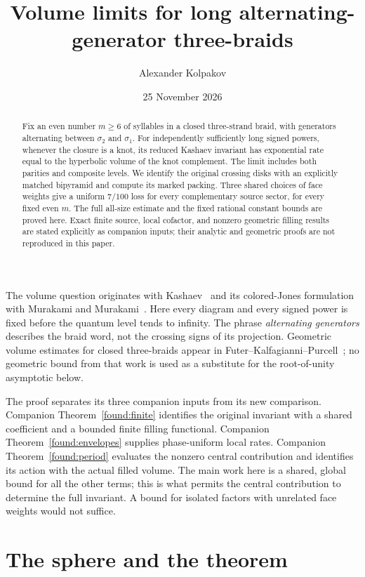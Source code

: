 \documentclass[11pt]{article}
\title{Volume limits for long alternating-generator three-braids}
\author{Alexander Kolpakov}\date{25 November 2026}
\numberwithin{equation}{section}
\begin{document}
\maketitle
\begin{abstract}
Fix an even number \(m\ge6\) of syllables in a closed three-strand braid,
with generators alternating between \(\sigma_2\) and \(\sigma_1\).
For independently sufficiently long signed powers, whenever the closure
is a knot, its reduced Kashaev invariant has exponential rate equal to
the hyperbolic volume of the knot complement. The limit includes both
parities and composite levels. We identify the original crossing disks
with an explicitly matched bipyramid and compute its marked packing.
Three shared choices of face weights give a uniform \(7/100\) loss for
every complementary source sector, for every fixed even \(m\).
The full all-size estimate and the fixed rational constant bounds are
proved here. Exact finite source, local cofactor, and nonzero geometric
filling results are stated explicitly as companion inputs; their
analytic and geometric proofs are not reproduced in this paper.
\end{abstract}

The volume question originates with Kashaev~\cite{Kashaev} and its
colored-Jones formulation with Murakami and Murakami~\cite{Murakami}.
Here every diagram and every signed power is fixed before the quantum
level tends to infinity. The phrase \emph{alternating generators}
describes the braid word, not the crossing signs of its projection.
Geometric volume estimates for closed three-braids appear in
Futer--Kalfagianni--Purcell~\cite{FKP}; no geometric bound from that work
is used as a substitute for the root-of-unity asymptotic below.

The proof separates its three companion inputs from its new comparison.
Companion Theorem~\ref{found:finite} identifies the original invariant
with a shared coefficient and a bounded finite filling functional.
Companion Theorem~\ref{found:envelopes} supplies phase-uniform local
rates. Companion Theorem~\ref{found:period} evaluates the nonzero central
contribution and identifies its action with the actual filled volume.
The main work here is a shared, global bound for all the other terms;
this is what permits the central contribution to determine the full
invariant. A bound for isolated factors with unrelated face weights
would not suffice.

\section{The sphere and the
theorem}\label{braid:sec-1}
\end{document}
